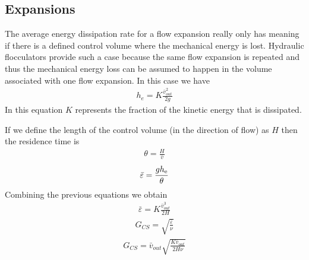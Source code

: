 \documentclass[letterpaper,10pt,english]{sphinxmanual}
\begin{document}
\subsection{Expansions}
\label{\detokenize{Rapid_Mix/RM_Derivations:expansions}}\label{\detokenize{Rapid_Mix/RM_Derivations:heading-expansions}}
The average energy dissipation rate for a flow expansion really only has meaning if there is a defined control volume where the mechanical energy is lost. Hydraulic flocculators provide such a case because the same flow expansion is repeated and thus the mechanical energy loss can be assumed to happen in the volume associated with one flow expansion. In this case we have
\begin{equation}\label{equation:Rapid_Mix/RM_Derivations:Rapid_Mix/RM_Derivations:96}
\begin{split}h_e =  K\frac{\bar v_{out}^2}{2g}\end{split}
\end{equation}
In this equation \(K\) represents the fraction of the kinetic energy that is dissipated.

If we define the length of the control volume (in the direction of flow) as \(H\) then the residence time is
\begin{equation}\label{equation:Rapid_Mix/RM_Derivations:Rapid_Mix/RM_Derivations:97}
\begin{split}\theta = \frac{H}{\bar v}\end{split}
\end{equation}\begin{equation}\label{equation:Rapid_Mix/RM_Derivations:Rapid_Mix/RM_Derivations:98}
\begin{split}\bar\varepsilon = \frac{gh_{\rm{e}}}{\theta}\end{split}
\end{equation}
Combining the previous equations we obtain
\begin{equation}\label{equation:Rapid_Mix/RM_Derivations:Rapid_Mix/RM_Derivations:99}
\begin{split}\bar\varepsilon = K\frac{\bar v_{out}^3}{2H}\end{split}
\end{equation}\begin{equation}\label{equation:Rapid_Mix/RM_Derivations:Rapid_Mix/RM_Derivations:100}
\begin{split}G_{CS} = \sqrt{\frac{\bar \varepsilon}{\nu}}\end{split}
\end{equation}\begin{equation}\label{equation:Rapid_Mix/RM_Derivations:Rapid_Mix/RM_Derivations:101}
\begin{split}G_{CS} = \bar v_{out}\sqrt{\frac{K\bar v_{out}}{2H\nu}}\end{split}
\end{equation}
\end{document}

